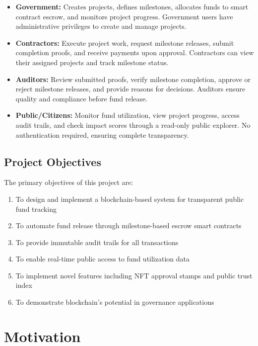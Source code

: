 \documentclass[12pt,a4wide]{report}
\theoremstyle{plain}
\theoremstyle{definition}
\theoremstyle{remark}
\begin{document}
\begin{itemize}
    \item \textbf{Government:} Creates projects, defines milestones, allocates funds to smart contract escrow, and monitors project progress. Government users have administrative privileges to create and manage projects.
    
    \item \textbf{Contractors:} Execute project work, request milestone releases, submit completion proofs, and receive payments upon approval. Contractors can view their assigned projects and track milestone status.
    
    \item \textbf{Auditors:} Review submitted proofs, verify milestone completion, approve or reject milestone releases, and provide reasons for decisions. Auditors ensure quality and compliance before fund release.
    
    \item \textbf{Public/Citizens:} Monitor fund utilization, view project progress, access audit trails, and check impact scores through a read-only public explorer. No authentication required, ensuring complete transparency.
\end{itemize}

\section{Project Objectives}

The primary objectives of this project are:
\begin{enumerate}
    \item To design and implement a blockchain-based system for transparent public fund tracking
    \item To automate fund release through milestone-based escrow smart contracts
    \item To provide immutable audit trails for all transactions
    \item To enable real-time public access to fund utilization data
    \item To implement novel features including NFT approval stamps and public trust index
    \item To demonstrate blockchain's potential in governance applications
\end{enumerate}

\chapter{Motivation}
\end{document}
